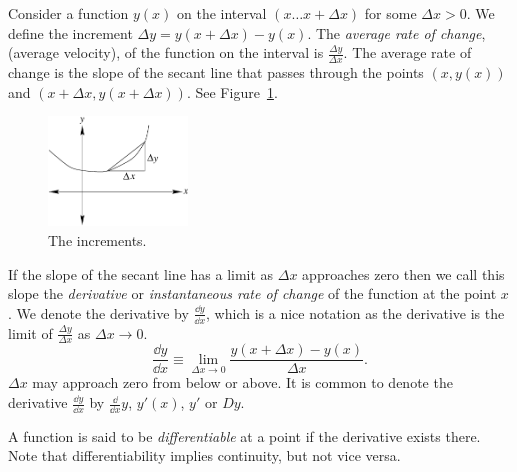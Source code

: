 Consider a function $y(x)$ on the interval $(x \ldots x+\Delta x)$
for some $\Delta x > 0$.
We define the increment $\Delta y = y(x + \Delta x) - y(x)$.  
The \textit{average rate of change}, (average velocity), of the function on the
interval is $\frac{\Delta y}{\Delta x}$.  The average rate of change 
is the slope of the secant line that passes through the points 
$(x, y(x))$ and $(x + \Delta x, y(x + \Delta x) )$.  
See Figure~\ref{increment}.


\begin{figure}[h!]
  \begin{center}
    \includegraphics[width=0.33\textwidth]{calculus/differential/increment}
  \end{center}
  \caption{The increments.}
  \label{increment}
\end{figure}



If the slope of the secant line has a limit as $\Delta x$ approaches
zero then we call this slope 
the \textit{derivative} or \textit{instantaneous rate of change} 
of the function at the point $x$.  We denote the derivative by
$\frac{\dd y}{\dd x}$, which is a nice notation as the derivative is the limit 
of $\frac{\Delta y}{\Delta x}$ as $\Delta x \to 0$.
\[
\frac{\dd y}{\dd x} \equiv \lim_{\Delta x \to 0} \frac{y(x + \Delta x) - y(x)}{\Delta x}.
\]
$\Delta x$ may approach zero from below or above.
It is common to denote the derivative $\frac{\dd y}{\dd x}$ by 
$\frac{\dd }{\dd x} y$, $y'(x)$, $y'$ or $D y$.

A function is said to be \textit{differentiable} at a point if the
derivative exists there.  Note that differentiability implies continuity,
but not vice versa.





